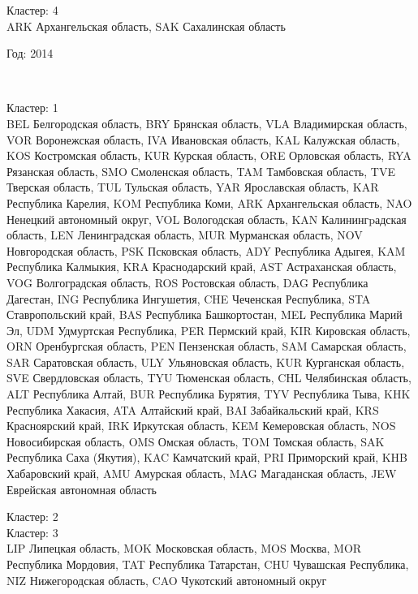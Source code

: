 \documentclass[11pt]{article}
\begin{document}
Кластер:  4 \\
ARK Архангельская область, SAK Сахалинская область


\begin{center}
Год:  2014
\end{center}

    \begin{center}
    \end{center}
    { \hspace*{\fill} \\}
    
Кластер:  1 \\
BEL Белгородская область, BRY Брянская область, VLA Владимирская область, VOR Воронежская область, IVA Ивановская область, KAL Калужская область, KOS Костромская область, KUR Курская область, ORE Орловская область, RYA Рязанская область, SMO Смоленская область, TAM Тамбовская область, TVE Тверская область, TUL Тульская область, YAR Ярославская область, KAR Республика Карелия, KOM Республика Коми, ARK Архангельская область, NAO Ненецкий автономный округ, VOL Вологодская область, KAN Калинингpадская область, LEN Ленинградская область, MUR Мурманская область, NOV Новгородская область, PSK Псковская область, ADY Республика Адыгея, KAM Республика Калмыкия, KRA Краснодарский край, AST Астраханская область, VOG Волгоградская область, ROS Ростовская область, DAG Республика Дагестан, ING Республика Ингушетия, CHE Чеченская Республика, STA Ставропольский край, BAS Республика Башкортостан, MEL Республика Марий Эл, UDM Удмуртская Республика, PER Пермский край, KIR Кировская область, ORN Оренбургская область, PEN Пензенская область, SAM Самарская область, SAR Саратовская область, ULY Ульяновская область, KUR Курганская область, SVE Свердловская область, TYU Тюменская область, CHL Челябинская область, ALT Республика Алтай, BUR Республика Бурятия, TYV Республика Тыва, KHK Республика Хакасия, ATA Алтайский край, BAI Забайкальский край, KRS Красноярский край, IRK Иркутская область, KEM Кемеровская область, NOS Новосибирская область, OMS Омская область, TOM Томская область, SAK Республика Саха (Якутия), KAC Камчатский край, PRI Приморский край, KHB Хабаровский край, AMU Амурская область, MAG Магаданская область, JEW Еврейская автономная область

Кластер:  2 \\


Кластер:  3 \\
LIP Липецкая область, MOK Московская область, MOS Москва, MOR Республика Мордовия, TAT Республика Татарстан, CHU Чувашская Республика, NIZ Нижегородская область, CAO Чукотский автономный округ
\end{document}
